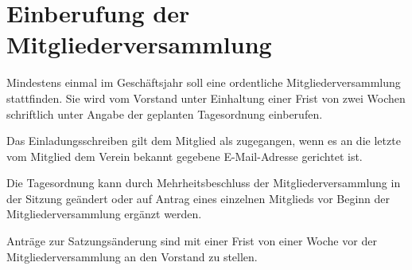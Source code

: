 \section{Einberufung der Mitgliederversammlung}
\begin{para}
	\item Mindestens einmal im Geschäftsjahr soll eine ordentliche Mitgliederversammlung stattfinden. Sie wird vom Vorstand unter Einhaltung einer Frist von zwei Wochen schriftlich unter Angabe der geplanten Tagesordnung einberufen.
	\item Das Einladungsschreiben gilt dem Mitglied als zugegangen, wenn es an die letzte vom Mitglied dem Verein bekannt gegebene E-Mail-Adresse gerichtet ist.
	\item Die Tagesordnung kann durch Mehrheitsbeschluss der Mitgliederversammlung in der Sitzung geändert oder auf Antrag eines einzelnen Mitglieds vor Beginn der Mitgliederversammlung ergänzt werden.
	\item Anträge zur Satzungsänderung sind mit einer Frist von einer Woche vor der Mitgliederversammlung an den Vorstand zu stellen.
\end{para}

